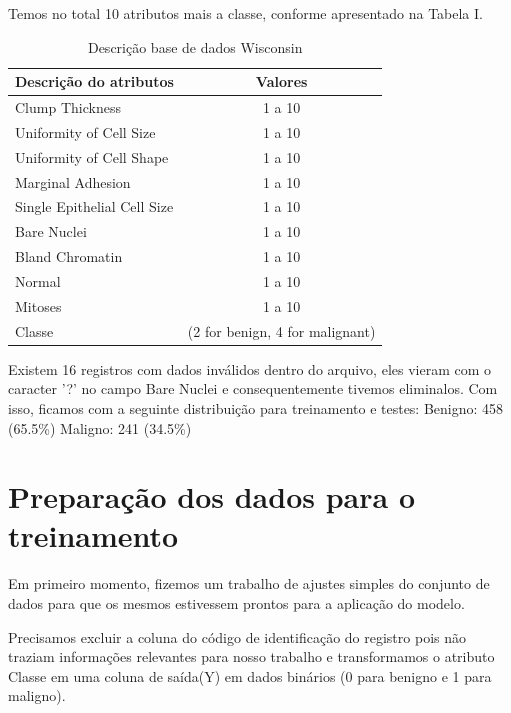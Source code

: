 \documentclass[conference]{IEEEtran}
\begin{document}
   Temos no total 10 atributos mais a classe, conforme apresentado na Tabela I.
    
    \begin{table}[h]
	\caption{Descrição base de dados Wisconsin}
	\begin{center}
    \begin{tabular}{l | c }
    \hline
       Descrição do atributos & Valores \\\hline
       Clump Thickness & 1 a 10 \\\hline
       Uniformity of Cell Size & 1 a 10 \\\hline
       Uniformity of Cell Shape & 1 a 10 \\\hline
       Marginal Adhesion & 1 a 10 \\\hline
       Single Epithelial Cell Size & 1 a 10 \\\hline
       Bare Nuclei & 1 a 10 \\\hline
       Bland Chromatin & 1 a 10 \\\hline
       Normal  & 1 a 10 \\\hline
       Mitoses & 1 a 10 \\\hline
       Classe &(2 for benign, 4 for malignant)\\\hline
    \end{tabular}
    \end{center}
    \end{table}
    

    Existem 16 registros com dados inválidos dentro do arquivo, eles vieram com o caracter '?'  no campo Bare Nuclei e consequentemente tivemos eliminalos. Com isso, ficamos com a seguinte distribuição para treinamento e testes: Benigno: 458 (65.5\%) Maligno: 241 (34.5\%)

	
	
\section{Preparação dos dados para o treinamento}
    
    Em primeiro momento, fizemos um trabalho de ajustes simples do conjunto de dados para que os mesmos estivessem prontos para a aplicação do modelo. 
    
    Precisamos excluir a coluna do código de identificação do registro pois não traziam informações relevantes para nosso trabalho e transformamos o atributo Classe em uma coluna de saída(Y) em dados binários (0 para benigno e 1 para maligno). 
    
\end{document}
